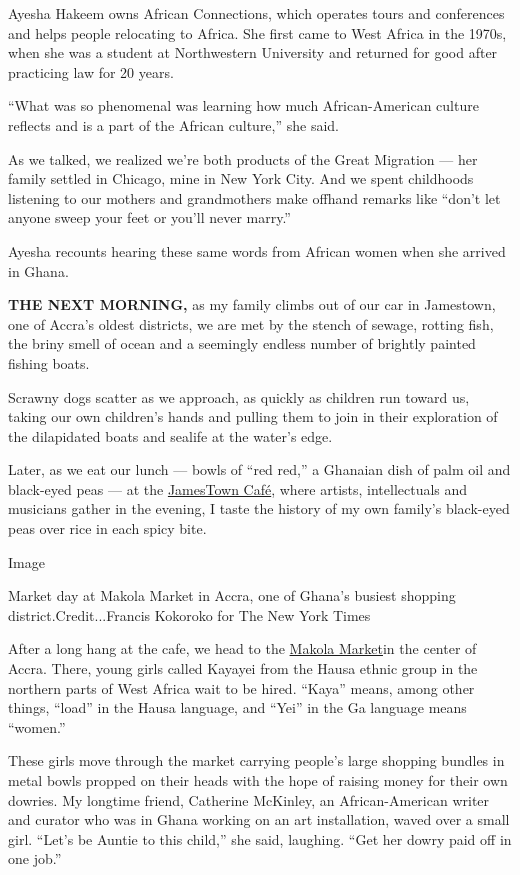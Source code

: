Ayesha Hakeem owns African Connections, which operates tours and
conferences and helps people relocating to Africa. She first came to
West Africa in the 1970s, when she was a student at Northwestern
University and returned for good after practicing law for 20 years.

``What was so phenomenal was learning how much African-American culture
reflects and is a part of the African culture,'' she said.

As we talked, we realized we're both products of the Great Migration ---
her family settled in Chicago, mine in New York City. And we spent
childhoods listening to our mothers and grandmothers make offhand
remarks like ``don't let anyone sweep your feet or you'll never marry.''

Ayesha recounts hearing these same words from African women when she
arrived in Ghana.

\textbf{THE NEXT MORNING,} as my family climbs out of our car in
Jamestown, one of Accra's oldest districts, we are met by the stench of
sewage, rotting fish, the briny smell of ocean and a seemingly endless
number of brightly painted fishing boats.

Scrawny dogs scatter as we approach, as quickly as children run toward
us, taking our own children's hands and pulling them to join in their
exploration of the dilapidated boats and sealife at the water's edge.

Later, as we eat our lunch --- bowls of ``red red,'' a Ghanaian dish of
palm oil and black-eyed peas --- at the
\href{https://www.lonelyplanet.com/ghana/accra/nightlife/jamestown-cafe/a/poi-dri/1556679/355309}{JamesTown
Café}, where artists, intellectuals and musicians gather in the evening,
I taste the history of my own family's black-eyed peas over rice in each
spicy bite.

Image

Market day at Makola Market in Accra, one of Ghana's busiest shopping
district.Credit...Francis Kokoroko for The New York Times

After a long hang at the cafe, we head to the
\href{https://visitghana.com/shopping_location/makola-market/}{Makola
Market}in the center of Accra. There, young girls called Kayayei from
the Hausa ethnic group in the northern parts of West Africa wait to be
hired. ``Kaya'' means, among other things, ``load'' in the Hausa
language, and ``Yei'' in the Ga language means ``women.''

These girls move through the market carrying people's large shopping
bundles in metal bowls propped on their heads with the hope of raising
money for their own dowries. My longtime friend, Catherine McKinley, an
African-American writer and curator who was in Ghana working on an art
installation, waved over a small girl. ``Let's be Auntie to this
child,'' she said, laughing. ``Get her dowry paid off in one job.''

